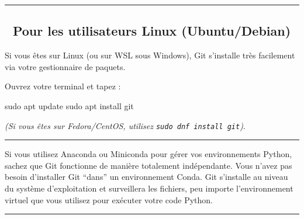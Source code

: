 \documentclass[
  letterpaper,
  DIV=11,
  numbers=noendperiod]{scrreprt}
\newenvironment{Shaded}{\begin{snugshade}}{\end{snugshade}}
\newcommand{\FunctionTok}[1]{\textcolor[rgb]{0.28,0.35,0.67}{#1}}
\newcommand{\NormalTok}[1]{\textcolor[rgb]{0.00,0.23,0.31}{#1}}
\begin{document}
\begin{center}\rule{0.5\linewidth}{0.5pt}\end{center}

\subsection{🐧 Pour les utilisateurs Linux
(Ubuntu/Debian)}\label{pour-les-utilisateurs-linux-ubuntudebian}

Si vous êtes sur Linux (ou sur WSL sous Windows), Git s'installe très
facilement via votre gestionnaire de paquets.

Ouvrez votre terminal et tapez :

\begin{Shaded}
\begin{Highlighting}[]
\FunctionTok{sudo}\NormalTok{ apt update}
\FunctionTok{sudo}\NormalTok{ apt install git}
\end{Highlighting}
\end{Shaded}

\emph{(Si vous êtes sur Fedora/CentOS, utilisez
\texttt{sudo\ dnf\ install\ git})}.

\begin{center}\rule{0.5\linewidth}{0.5pt}\end{center}

\begin{tcolorbox}[enhanced jigsaw, arc=.35mm, bottomrule=.15mm, bottomtitle=1mm, breakable, colback=white, colbacktitle=quarto-callout-note-color!10!white, colframe=quarto-callout-note-color-frame, coltitle=black, left=2mm, leftrule=.75mm, opacityback=0, opacitybacktitle=0.6, rightrule=.15mm, title=\textcolor{quarto-callout-note-color}{\faInfo}\hspace{0.5em}{Git et Anaconda / Miniconda}, titlerule=0mm, toprule=.15mm, toptitle=1mm]

Si vous utilisez Anaconda ou Miniconda pour gérer vos environnements
Python, sachez que Git fonctionne de manière totalement indépendante.
Vous n'avez pas besoin d'installer Git ``dans'' un environnement Conda.
Git s'installe au niveau du système d'exploitation et surveillera les
fichiers, peu importe l'environnement virtuel que vous utilisez pour
exécuter votre code Python.

\end{tcolorbox}

\begin{center}\rule{0.5\linewidth}{0.5pt}\end{center}
\end{document}
